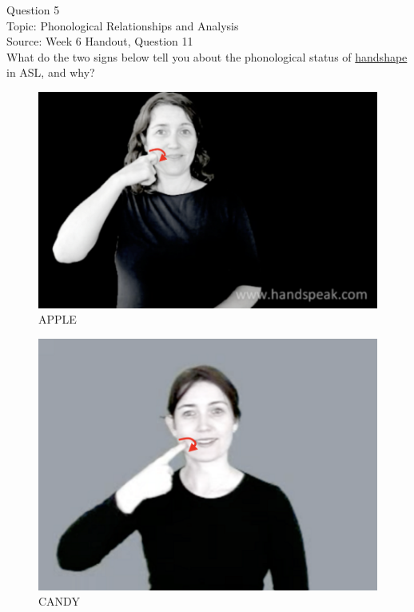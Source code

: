 \documentclass[12pt]{article}
\begin{document}
{\large Question 5}\\

Topic: Phonological Relationships and Analysis\\
Source: Week 6 Handout, Question 11\\

What do the two signs below tell you about the phonological status of \underline{handshape} in ASL, and why?\\

\begin{figure}[H]
\includegraphics{../images/asl_apple.png}
\caption{APPLE}
\end{figure}
\begin{figure}[H]
\includegraphics{../images/asl_candy.png}
\caption{CANDY}
\end{figure}
\end{document}
